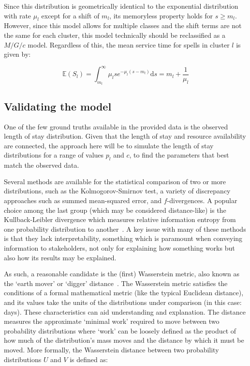 Since this distribution is geometrically identical to the exponential
distribution with rate \(\mu_l\) except for a shift of \(m_l\), its memoryless
property holds for \(s \ge m_l\). However, since this model allows for multiple
classes and the shift terms are not the same for each cluster, this model
technically should be reclassified as a \(M/G/c\) model. Regardless of this, the
mean service time for spells in cluster \(l\) is given by:

\begin{equation}\label{eq:services}
    \mathbb E \left(S_l\right)
    = \int_{m_l}^{\infty} \mu_l s e^{-\mu_l (s - m_l)} \mathrm ds
    = m_l + \frac{1}{\mu_l}
\end{equation}

\subsection{Validating the model}\label{subsec:validate}

One of the few ground truths available in the provided data is the observed
length of stay distribution. Given that the length of stay and resource
availability are connected, the approach here will be to simulate the length of
stay distributions for a range of values \(p_l\) and \(c\), to find the
parameters that best match the observed data.

Several methods are available for the statistical comparison of two or more
distributions, such as the Kolmogorov-Smirnov test, a variety of discrepancy
approaches such as summed mean-squared error, and \(f\)-divergences. A popular
choice among the last group (which may be considered distance-like) is the
Kullback-Leibler divergence which measures relative information entropy from one
probability distribution to another~\cite{Kullback1951}. A key issue with many
of these methods is that they lack interpretability, something which is
paramount when conveying information to stakeholders, not only for explaining
how something works but also how its results may be explained.

As such, a reasonable candidate is the (first) Wasserstein metric, also known as
the `earth mover' or `digger' distance~\cite{Vaserstein1969}. The Wasserstein
metric satisfies the conditions of a formal mathematical metric (like the
typical Euclidean distance), and its values take the units of the distributions
under comparison (in this case: days). These characteristics can aid
understanding and explanation. The distance measures the
approximate `minimal work' required to move between two probability
distributions where `work' can be loosely defined as the product of how much of
the distribution's mass moves and the distance by which it must be moved. More
formally, the Wasserstein distance between two probability distributions \(U\)
and \(V\) is defined as:

